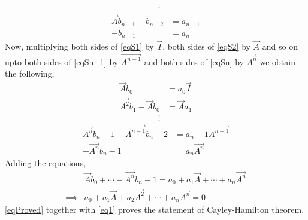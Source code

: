 \documentclass[journal,12pt,twocolumn]{IEEEtran}
\begin{document}
\begin{align*}
&\vdots   
\end{align*}
\begin{align}
\vec{A}b_{n-1} - b_{n-2} &= a_{n-1}\label{eqSn_1}\\
-b_{n-1} &= a_n \label{eqSn}
\end{align}
Now, multiplying both sides of \eqref{eqS1} by $\vec{I}$, both sides of \eqref{eqS2} by $\vec{A}$ and so on upto both sides of \eqref{eqSn_1} by $\vec{A^{n-1}}$ and  both sides of \eqref{eqSn} by $\vec{A^{n}}$ we obtain the following,
\begin{align}
\vec{A}b_0 &= a_0\vec{I}\\
\vec{A^{2}}b_1-\vec{A}b_0 &= \vec{A}a_1
\end{align}
\begin{align*}
&\vdots   
\end{align*}
\begin{align}
\vec{A^{n}}b_n-1-\vec{A^{n-1}}b_n-2 &= a_n-1\vec{A^{n-1}}\\
-\vec{A^{n}}b_n-1 &= a_n\vec{A^{n}}
\end{align}
Adding the equations,
\begin{align}
&\vec{A}b_0+\cdots-\vec{A^{n}}b_n-1=a_0 + a_1\vec{A}+\cdots+a_n\vec{A^{n}}\\
\implies &a_0 + a_1\vec{A} + a_2\vec{A^{2}} +  \cdots+a_n\vec{A^{n}} = 0 \label{eqProved}
\end{align}
\eqref{eqProved} together with \eqref{eq1} proves the statement of Cayley-Hamilton theorem.
\\
\end{document}
